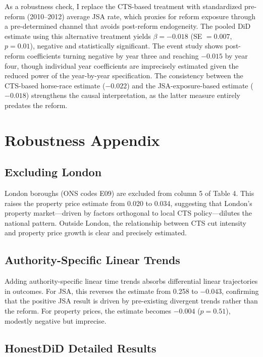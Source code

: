 \documentclass[12pt]{article}
\begin{document}
As a robustness check, I replace the CTS-based treatment with standardized pre-reform (2010--2012) average JSA rate, which proxies for reform exposure through a pre-determined channel that avoids post-reform endogeneity. The pooled DiD estimate using this alternative treatment yields $\beta = -0.018$ (SE $= 0.007$, $p = 0.01$), negative and statistically significant. The event study shows post-reform coefficients turning negative by year three and reaching $-0.015$ by year four, though individual year coefficients are imprecisely estimated given the reduced power of the year-by-year specification. The consistency between the CTS-based horse-race estimate ($-0.022$) and the JSA-exposure-based estimate ($-0.018$) strengthens the causal interpretation, as the latter measure entirely predates the reform.

\section{Robustness Appendix}\label{app:robust}

\subsection{Excluding London}

London boroughs (ONS codes E09) are excluded from column 5 of Table 4. This raises the property price estimate from 0.020 to 0.034, suggesting that London's property market---driven by factors orthogonal to local CTS policy---dilutes the national pattern. Outside London, the relationship between CTS cut intensity and property price growth is clear and precisely estimated.

\subsection{Authority-Specific Linear Trends}

Adding authority-specific linear time trends absorbs differential linear trajectories in outcomes. For JSA, this reverses the estimate from 0.258 to $-0.043$, confirming that the positive JSA result is driven by pre-existing divergent trends rather than the reform. For property prices, the estimate becomes $-0.004$ ($p = 0.51$), modestly negative but imprecise.

\subsection{HonestDiD Detailed Results}
\end{document}
